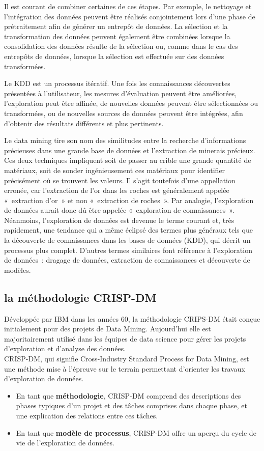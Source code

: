 \documentclass[a4paper,12pt]{article}
\begin{document}
        Il est courant de combiner certaines de ces étapes. Par exemple, le nettoyage et l'intégration des données peuvent être réalisés conjointement lors d'une phase de prétraitement afin de générer un entrepôt de données. La sélection et la transformation des données peuvent également être combinées lorsque la consolidation des données résulte de la sélection ou, comme dans le cas des entrepôts de données, lorsque la sélection est effectuée sur des données transformées.

        Le KDD est un processus itératif. Une fois les connaissances découvertes présentées à l'utilisateur, les mesures d'évaluation peuvent être améliorées, l'exploration peut être affinée, de nouvelles données peuvent être sélectionnées ou transformées, ou de nouvelles sources de données peuvent être intégrées, afin d'obtenir des résultats différents et plus pertinents.

        Le data mining tire son nom des similitudes entre la recherche d'informations précieuses dans une grande base de données et l'extraction de minerais précieux. Ces deux techniques impliquent soit de passer au crible une grande quantité de matériaux, soit de sonder ingénieusement ces matériaux pour identifier précisément où se trouvent les valeurs. Il s'agit toutefois d'une appellation erronée, car l'extraction de l'or dans les roches est généralement appelée « extraction d'or » et non « extraction de roches ». Par analogie, l'exploration de données aurait donc dû être appelée « exploration de connaissances ». Néanmoins, l'exploration de données est devenue le terme courant et, très rapidement, une tendance qui a même éclipsé des termes plus généraux tels que la découverte de connaissances dans les bases de données (KDD), qui décrit un processus plus complet. D'autres termes similaires font référence à l'exploration de données : dragage de données, extraction de connaissances et découverte de modèles.

    \subsection{la méthodologie CRISP-DM}
        Développée par IBM dans les années 60, la méthodologie CRIPS-DM était conçue initialement pour des projets de Data Mining. Aujourd'hui elle est majoritairement utilisé dans les équipes de data science pour gérer les projets d’exploration et d’analyse des données.\\
        CRISP-DM, qui signifie Cross-Industry Standard Process for Data Mining, est une méthode mise à l'épreuve sur le terrain permettant d'orienter les travaux d'exploration de données.
        \begin{itemize}
            \item En tant que \textbf{méthodologie}, CRISP-DM comprend des descriptions des phases typiques d'un projet et des tâches comprises dans chaque phase, et une explication des relations entre ces tâches.
            \item En tant que \textbf{modèle de processus}, CRISP-DM offre un aperçu du cycle de vie de l'exploration de données.
        \end{itemize}
        
\end{document}
